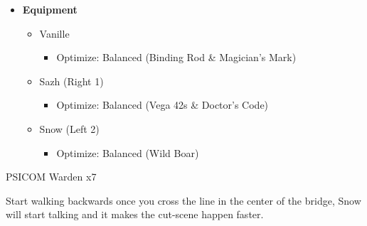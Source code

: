 \begin{paracol}{2}
\begin{menu}
\begin{itemize}
			\item \textbf{Equipment}
			      \begin{itemize}
				      \item Vanille
				            \begin{itemize}
					            \item Optimize: Balanced (Binding Rod \& Magician's Mark)
				            \end{itemize}
				      \item Sazh (Right 1)
				            \begin{itemize}
					            \item Optimize: Balanced (Vega 42s \& Doctor's Code)
				            \end{itemize}
				      \item Snow (Left 2)
				            \begin{itemize}
					            \item Optimize: Balanced (Wild Boar)
				            \end{itemize}
			      \end{itemize}
		\end{itemize}
	\end{menu}

	\renewcommand{\first}{[1] Tri-Disaster (\rav/\rav/\rav)}

	\renewcommand{\second}{[2] Solidarity (\com/\sen/\med)}

	\renewcommand{\third}{[3] Aggression (\com/\com/\rav)}

	\renewcommand{\fourth}{[4] Aggression (\com/\com/\rav)}
	\switchcolumn*

	\begin{battle}{PSICOM Warden x7}
		 
	\end{battle}


	Start walking backwards once you cross the line in the center of the bridge, Snow will start talking and it makes the cut-scene happen faster.


\end{paracol}
